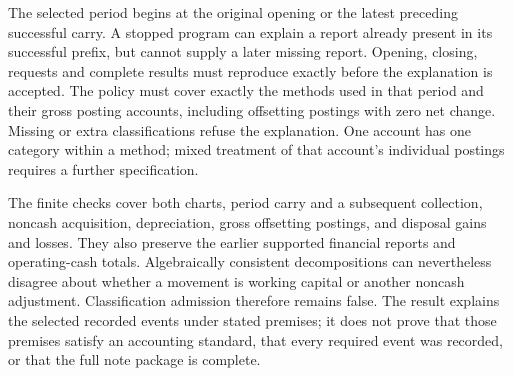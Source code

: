 The selected period begins at the original opening or the latest preceding
successful carry. A stopped program can explain a report already present in
its successful prefix, but cannot supply a later missing report. Opening,
closing, requests and complete results must reproduce exactly before the
explanation is accepted. The policy must cover exactly the methods used in
that period and their gross posting accounts, including offsetting postings
with zero net change. Missing or extra classifications refuse the explanation.
One account has one category within a method; mixed treatment of that account's
individual postings requires a further specification.

The finite checks cover both charts, period carry and a subsequent collection,
noncash acquisition, depreciation, gross offsetting postings, and disposal gains
and losses. They also preserve the earlier supported financial reports and
operating-cash totals. Algebraically consistent decompositions can nevertheless
disagree about whether a movement is working capital or another noncash
adjustment. Classification admission therefore remains false. The result
explains the selected recorded events under stated premises; it does not prove
that those premises satisfy an accounting standard, that every required event
was recorded, or that the full note package is complete.
